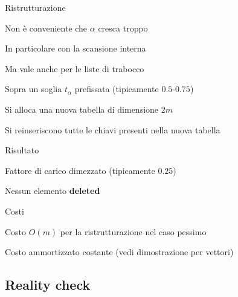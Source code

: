 \begin{frame}{Ristrutturazione}

\BIL
\item Non è conveniente che $\alpha$ cresca troppo
	\BI
	\item In particolare con la scansione interna
	\item Ma vale anche per le liste di trabocco
	\EI
\item Sopra un soglia $t_\alpha$ prefissata (tipicamente $0.5$-$0.75$)
\BI
\item  Si alloca una nuova tabella di dimensione $2m$
\item Si reinseriscono tutte le chiavi presenti nella nuova tabella
\EI
\item Risultato
\BI
	\item Fattore di carico dimezzato (tipicamente $0.25$)
	\item Nessun elemento \textbf{deleted}
\EI
\item Costi
\BI
\item Costo $O(m)$ per la ristrutturazione nel caso pessimo
\item Costo ammortizzato costante (vedi dimostrazione per vettori)
\EI
\EIL

\end{frame}

\subsection{Reality check}

